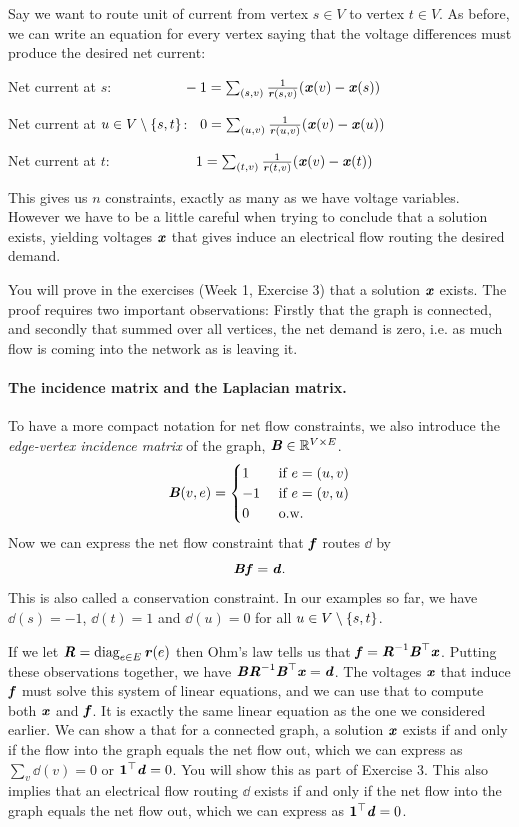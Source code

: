 Say we want to route unit of current from vertex $s \in V$ to vertex
$t \in V$.
As before, we can write an equation for every vertex saying that the
voltage differences must produce the desired net current:
\begin{tight_itemize}
\item Net current at $s$:
  $\phantom{----,,,}-1 = \sum_{(s,v)} \frac{1}{\boldsymbol{\mathit{r}}(s,v)} (\boldsymbol{\mathit{x}}(v) - \boldsymbol{\mathit{x}}(s))$
\item Net current at $u \in V\setminus\left\{s,t \right\}$:
  $\phantom{..} 0 = \sum_{(u,v)} \frac{1}{\boldsymbol{\mathit{r}}(u,v)} (\boldsymbol{\mathit{x}}(v) - \boldsymbol{\mathit{x}}(u))$
\item Net current at  $t$:  $\phantom{------,} 1=\sum_{(t,v)} \frac{1}{\boldsymbol{\mathit{r}}(t,v)} (\boldsymbol{\mathit{x}}(v) - \boldsymbol{\mathit{x}}(t))$
\end{tight_itemize}
This gives us $n$ constraints, exactly as many as we have voltage
variables.
However we have to be a little careful when trying to conclude that a
solution exists, yielding voltages $\boldsymbol{\mathit{x}}$ that gives induce an
electrical flow routing the desired demand.


You will prove in the exercises (Week 1, Exercise 3) that a solution $\boldsymbol{\mathit{x}}$ exists. The proof requires two
important observations: Firstly that the graph is connected, and
secondly that summed over all vertices, the net demand is zero,
i.e. as much flow is coming into the network as is leaving it.

\paragraph{The incidence matrix and the Laplacian matrix.}
To have a more compact notation for net flow constraints, we also
introduce the \emph{edge-vertex incidence matrix} of the graph,
$\boldsymbol{\mathit{B}} \in \mathbb{R}^{V \times E}$.
\[
  \boldsymbol{\mathit{B}}(v,e) =
  \begin{cases}
    1 & \text{ if } e = (u,v) \\
    -1 &\text{ if } e = (v,u) \\
    0 &\text{ o.w.}
  \end{cases}
\]
%
Now we can express the net flow constraint that $\boldsymbol{\mathit{f}}$ routes $\dd$ by
\[
  \boldsymbol{\mathit{B}} \boldsymbol{\mathit{f}} = \boldsymbol{\mathit{d}}
  .
\]
This is also called a conservation constraint. In our examples so far,
we have $\dd(s) = -1$, $\dd(t) = 1$ and $\dd(u) = 0$ for all $u\in V\setminus\left\{s,t \right\}$.

If we let $\boldsymbol{\mathit{R}} = \operatorname*{diag}_{e \in E} \boldsymbol{\mathit{r}}(e)$
then Ohm's law tells us that $\boldsymbol{\mathit{f}} = \boldsymbol{\mathit{R}}^{-1}\boldsymbol{\mathit{B}}^{\top} \boldsymbol{\mathit{x}}$.
Putting these observations together, we have $\boldsymbol{\mathit{B}} \boldsymbol{\mathit{R}}^{-1}\boldsymbol{\mathit{B}}^{\top}
\boldsymbol{\mathit{x}}= \boldsymbol{\mathit{d}}$.
The voltages $\boldsymbol{\mathit{x}}$ that induce $\boldsymbol{\mathit{f}}$ must solve this system of linear
equations, and we can use that to compute both $\boldsymbol{\mathit{x}}$ and $\boldsymbol{\mathit{f}}$.
It is exactly the same linear
equation as the one we considered earlier.
We can show a that for a connected graph, a solution $\boldsymbol{\mathit{x}}$
exists if and only if the
flow into the graph equals the net flow out, which we can express as
$\sum_{v} \dd(v) = 0$ or $\boldsymbol{1}^\top \boldsymbol{\mathit{d}} = 0$.
You will show this as part of Exercise 3.
This also implies that an electrical flow routing
$\dd$ exists if and only if the net
flow into the graph equals the net flow out, which we can express as
$\boldsymbol{1}^\top \boldsymbol{\mathit{d}} = 0$.


